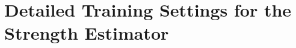 \newpage

\appendix



\section{Detailed Training Settings for the Strength Estimator}
\label{app:traning_details}

